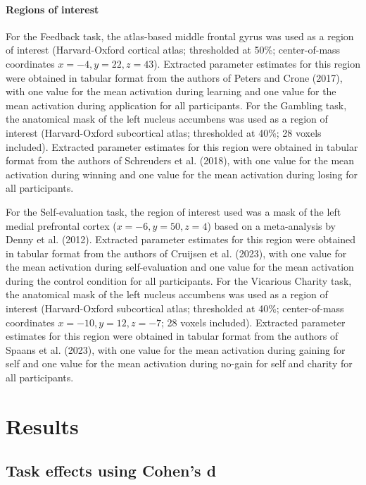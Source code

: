\documentclass[
  letterpaper,
  DIV=11,
  numbers=noendperiod]{scrartcl}
\let\oldparagraph\paragraph
\renewcommand{\paragraph}[1]{\oldparagraph{#1}\mbox{}}
\begin{document}
\paragraph{Regions of interest}\label{regions-of-interest}

For the Feedback task, the atlas-based middle frontal gyrus was used as
a region of interest (Harvard-Oxford cortical atlas; thresholded at
50\%; center-of-mass coordinates \(x = -4, y = 22, z = 43\)). Extracted
parameter estimates for this region were obtained in tabular format from
the authors of Peters and Crone (2017), with one value for the mean
activation during learning and one value for the mean activation during
application for all participants. For the Gambling task, the anatomical
mask of the left nucleus accumbens was used as a region of interest
(Harvard-Oxford subcortical atlas; thresholded at 40\%; 28 voxels
included). Extracted parameter estimates for this region were obtained
in tabular format from the authors of Schreuders et al. (2018), with one
value for the mean activation during winning and one value for the mean
activation during losing for all participants.

For the Self-evaluation task, the region of interest used was a mask of
the left medial prefrontal cortex (\(x = −6, y = 50, z = 4\)) based on a
meta-analysis by Denny et al. (2012). Extracted parameter estimates for
this region were obtained in tabular format from the authors of Cruijsen
et al. (2023), with one value for the mean activation during
self-evaluation and one value for the mean activation during the control
condition for all participants. For the Vicarious Charity task, the
anatomical mask of the left nucleus accumbens was used as a region of
interest (Harvard-Oxford subcortical atlas; thresholded at 40\%;
center-of-mass coordinates \(x = −10, y = 12, z = −7\); 28 voxels
included). Extracted parameter estimates for this region were obtained
in tabular format from the authors of Spaans et al. (2023), with one
value for the mean activation during gaining for self and one value for
the mean activation during no-gain for self and charity for all
participants.

\section{Results}\label{results}

\subsection{Task effects using Cohen's
d}\label{task-effects-using-cohens-d}
\end{document}
